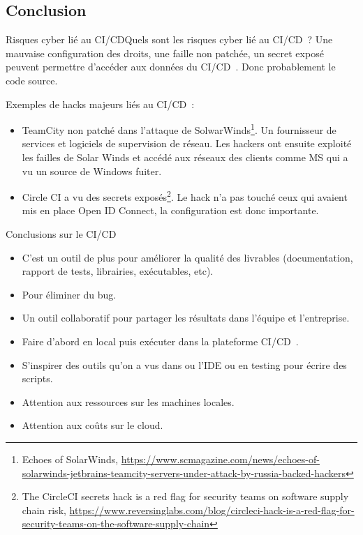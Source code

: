 \documentclass{beamer}
\begin{document}
    \subsection{Conclusion}\label{subsec:conclusion}
    \begin{frame}{Risques cyber lié au CI/CD}{Quels sont les risques cyber lié au CI/CD~?}
        \transdissolve
        \pause
        Une mauvaise configuration des droits, une faille non patchée, un secret exposé peuvent permettre d'accéder aux données du CI/CD~.
        Donc probablement le code source.

        Exemples de hacks majeurs liés au CI/CD~:
        \begin{itemize}
            \item TeamCity non patché dans l'attaque de SolwarWinds\footnote{Echoes of SolarWinds, \url{https://www.scmagazine.com/news/echoes-of-solarwinds-jetbrains-teamcity-servers-under-attack-by-russia-backed-hackers}}.
            Un fournisseur de services et logiciels de supervision de réseau.
            Les hackers ont ensuite exploité les failles de Solar Winds et accédé aux réseaux des clients comme MS qui a vu un source de Windows fuiter.
            \item Circle CI a vu des secrets exposés\footnote{The CircleCI secrets hack is a red flag for security teams on software supply chain risk, \url{https://www.reversinglabs.com/blog/circleci-hack-is-a-red-flag-for-security-teams-on-the-software-supply-chain}}.
            Le hack n'a pas touché ceux qui avaient mis en place Open ID Connect, la configuration est donc importante.
        \end{itemize}
    \end{frame}

    \begin{frame}{Conclusions sur le CI/CD}
        \transdissolve
        \begin{itemize}
            \item C'est un outil de plus pour améliorer la qualité des livrables (documentation, rapport de tests, librairies, exécutables, etc).
            \item Pour éliminer du bug.
            \item Un outil collaboratif pour partager les résultats dans l'équipe et l'entreprise.
            \item Faire d'abord en local puis exécuter dans la plateforme CI/CD~.
            \item S'inspirer des outils qu'on a vus dans ou l'IDE ou en testing pour écrire des scripts.
            \item Attention aux ressources sur les machines locales.
            \item Attention aux coûts sur le cloud.
        \end{itemize}
    \end{frame}
\end{document}
